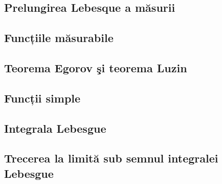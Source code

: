 \documentclass[a4paper,12pt]{article}
\theoremstyle{change}
\begin{document}
\subsection{Prelungirea Lebesque a măsurii}


\subsection{Funcțiile măsurabile}

\subsection{Teorema Egorov şi teorema Luzin}


\subsection{Funcții simple}

\subsection{Integrala Lebesgue}


\subsection{Trecerea la limită sub semnul integralei Lebesgue}
\end{document}
